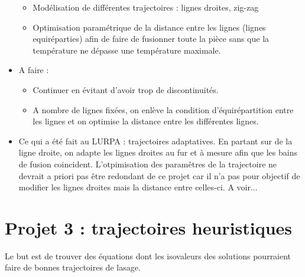 \documentclass[11pt,a4paper]{article}
\begin{document}
\begin{itemize}
\begin{itemize}
\begin{itemize}
				
			\end{itemize}
			
			\item Modélisation de différentes trajectoires : lignes droites, zig-zag
			
			\item Optimisation paramétrique de la distance entre les lignes (lignes equiréparties) afin de faire de fusionner toute la pièce sans que la température ne dépasse une température maximale.
		\end{itemize}
		
		\item A faire :
		\begin{itemize}
			\item Continuer en évitant d'avoir trop de discontinuités.
			\item A nombre de lignes fixées, on enlève la condition d'équirépartition entre les lignes et on optimise la distance entre les différentes lignes.
		\end{itemize}
		
		\item Ce qui a été fait au LURPA : trajectoires adaptatives. En partant sur de la ligne droite, on adapte les lignes droites au fur et à mesure afin que les bains de fusion coincident. L'otpimisation des paramêtres de la trajectoire ne devrait a priori pas être redondant de ce projet car il n'a pas pour objectif de modifier les lignes droites mais la distance entre celles-ci. A voir...
		
\end{itemize}

\section{Projet 3 : trajectoires heuristiques}

Le but est de trouver des équations dont les isovaleurs des solutions pourraient faire de bonnes trajectoires de lasage. 
\end{document}
